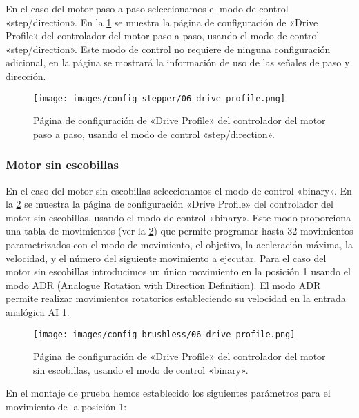 \documentclass[english,spanish,a4paper,11pt]{article}
\begin{document}
En el caso del motor paso a paso seleccionamos el modo de control «step/direction». En la \cref{fig:conf_stepper_6} se muestra la página de configuración de «Drive Profile» del controlador del motor paso a paso, usando el modo de control «step/direction». Este modo de control no requiere de ninguna configuración adicional, en la página se mostrará la información de uso de las señales de paso y dirección.

\begin{figure}[!ht]
    \centering
    \texttt{[image: images/config-stepper/06-drive\_profile.png]}
    \caption{Página de configuración de «Drive Profile» del controlador del motor paso a paso, usando el modo de control «step/direction».}
    \label{fig:conf_stepper_6}
\end{figure}


\subsubsection{Motor sin escobillas}

En el caso del motor sin escobillas seleccionamos el modo de control «binary». En la \cref{fig:conf_brushless_6} se muestra la página de configuración «Drive Profile» del controlador del motor sin escobillas, usando el modo de control «binary». Este modo proporciona una tabla de movimientos (ver la \cref{fig:conf_brushless_6}) que permite programar hasta 32 movimientos parametrizados con el modo de movimiento, el objetivo, la aceleración máxima, la velocidad, y el número del siguiente movimiento a ejecutar. Para el caso del motor sin escobillas introducimos un único movimiento en la posición 1 usando el modo ADR (Analogue Rotation with Direction Definition). El modo ADR permite realizar movimientos rotatorios estableciendo su velocidad en la entrada analógica AI 1.

\begin{figure}[!ht]
    \centering
    \texttt{[image: images/config-brushless/06-drive\_profile.png]}
    \caption{Página de configuración de «Drive Profile» del controlador del motor sin escobillas, usando el modo de control «binary».}
    \label{fig:conf_brushless_6}
\end{figure}

En el montaje de prueba hemos establecido los siguientes parámetros para el movimiento de la posición 1:
\end{document}

